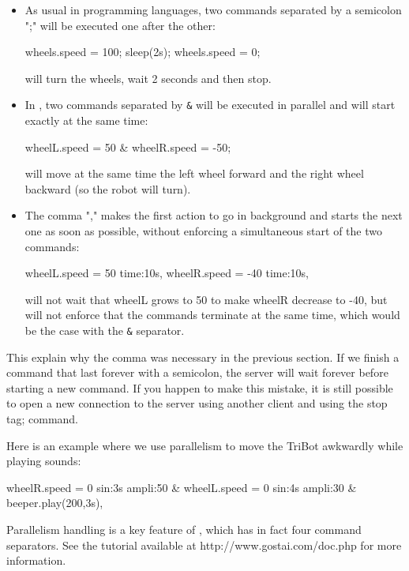\begin{itemize}
\item As usual in programming languages, two commands separated by a
  semicolon ";" will be executed one after the other:
\begin{urbiunchecked}
wheels.speed = 100;
sleep(2s);
wheels.speed = 0;
\end{urbiunchecked}

will turn the wheels, wait 2 seconds and then stop.

\item In \urbi, two commands separated by \lstinline|&| will be executed in
  parallel and will start exactly at the same time:
\begin{urbiunchecked}
wheelL.speed = 50 & wheelR.speed = -50;
\end{urbiunchecked}

will move at the same time the left wheel forward and the right wheel
backward (so the robot will turn).

\item The comma "," makes the first action to go in background and starts
  the next one as soon as possible, without enforcing a simultaneous start
  of the two commands:
\begin{urbiunchecked}
wheelL.speed = 50 time:10s,
wheelR.speed = -40 time:10s,
\end{urbiunchecked}

will not wait that wheelL grows to 50 to make wheelR decrease to -40, but
will not enforce that the commands terminate at the same time, which would
be the case with the \lstinline|&| separator.
\end{itemize}

This explain why the comma was necessary in the previous section. If we finish
a command that last forever with a semicolon, the server will wait forever
before starting a new command. If you happen to make this mistake, it is still
possible to open a new connection to the \urbi server using another client and
using the stop tag; command.

Here is an example where we use parallelism to move the TriBot awkwardly while
playing sounds:
\begin{urbiunchecked}
wheelR.speed = 0 sin:3s ampli:50 &
wheelL.speed = 0 sin:4s ampli:30 &
beeper.play(200,3s),
\end{urbiunchecked}

Parallelism handling is a key feature of \urbi, which has in fact four command
separators. See the \urbi tutorial available at http://www.gostai.com/doc.php
for more information.

